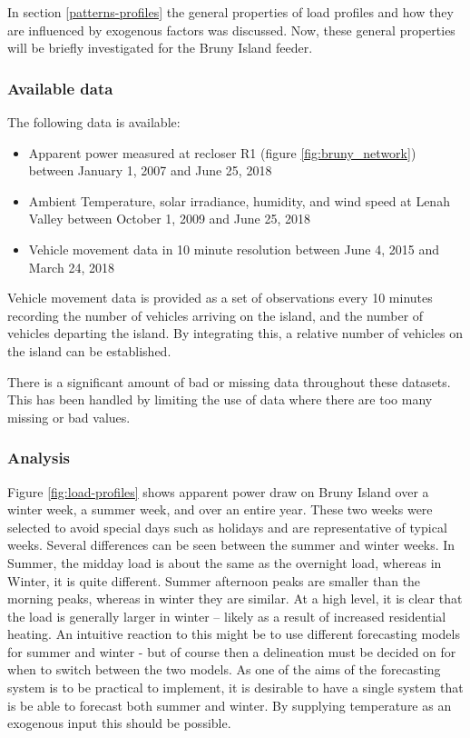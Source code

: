 In section \ref{patterns-profiles} the general properties of load profiles and how they are influenced by exogenous factors was discussed. Now, these general properties will be briefly investigated for the Bruny Island feeder.
\subsubsection{Available data}
The following data is available:
\begin{itemize}
	\item Apparent power measured at recloser R1 (figure \ref{fig:bruny_network}) between January 1, 2007 and June 25, 2018
	\item Ambient Temperature, solar irradiance, humidity, and wind speed at Lenah Valley between October 1, 2009 and June 25, 2018
	\item Vehicle movement data in 10 minute resolution between June 4, 2015 and March 24, 2018
\end{itemize}	
Vehicle movement data is provided as a set of observations every 10 minutes recording the number of vehicles arriving on the island, and the number of vehicles departing the island.
By integrating this, a relative number of vehicles on the island can be established.

There is a significant amount of bad or missing data throughout these datasets.
This has been handled by limiting the use of data where there are too many missing or bad values.

\subsubsection{Analysis}
Figure \ref{fig:load-profiles} shows apparent power draw on Bruny Island over a winter week, a summer week, and over an entire year.
These two weeks were selected to avoid special days such as holidays and are representative of typical weeks.
Several differences can be seen between the summer and winter weeks.
In Summer, the midday load is about the same as the overnight load, whereas in Winter, it is quite different.
Summer afternoon peaks are smaller than the morning peaks, whereas in winter they are similar.
At a high level, it is clear that the load is generally larger in winter -- likely as a result of increased residential heating.
An intuitive reaction to this might be to use different forecasting models for summer and winter - but of course then a delineation must be decided on for when to switch between the two models.
As one of the aims of the forecasting system is to be practical to implement, it is desirable to have a single system that is be able to forecast both summer and winter.
By supplying temperature as an exogenous input this should be possible.


